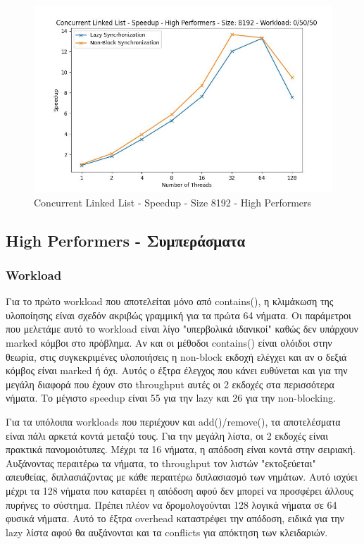 \documentclass[../final_report.tex]{subfiles}
\begin{document}
\begin{figure}[H]
        \includegraphics[scale=0.4]{outFiles/plots/concurrent_data_structs_high_speedup_8192_0_50_50.jpg}
    \caption{Concurrent Linked List - Speedup - Size 8192 - High Performers}
    \label{fig:Concurrent Linked List - Speedup - Size 8192 - High Performers}
\end{figure}

\subsection*{High Performers - Συμπεράσματα}
\subsubsection*{Workload}
Για το πρώτο workload που αποτελείται μόνο από contains(), η κλιμάκωση της υλοποίησης είναι σχεδόν ακριβώς γραμμική
για τα πρώτα 64 νήματα. Οι παράμετροι που μελετάμε αυτό το workload είναι λίγο "υπερβολικά ιδανικοί" καθώς δεν υπάρχουν
marked κόμβοι στο πρόβλημα. Αν και οι μέθοδοι contains() είναι ολόιδοι στην θεωρία, στις συγκεκριμένες υλοποιήσεις η non-block
εκδοχή ελέγχει και αν ο δεξιά κόμβος είναι marked ή όχι. Αυτός ο έξτρα έλεγχος που κάνει ευθύνεται και για την μεγάλη διαφορά που
έχουν στο throughput αυτές οι 2 εκδοχές στα περισσότερα νήματα. Το μέγιστο speedup είναι 55 για την lazy και 26 για την non-blocking.

Για τα υπόλοιπα workloads που περιέχουν και add()/remove(), τα αποτελέσματα είναι πάλι αρκετά κοντά μεταξύ τους. Για την μεγάλη λίστα,
οι 2 εκδοχές είναι πρακτικά πανομοιότυπες. Μέχρι τα 16 νήματα, η απόδοση είναι κοντά στην σειριακή. Αυξάνοντας περαιτέρω τα νήματα, το 
throughput τον λιστών "εκτοξεύεται" απευθείας, διπλασιάζοντας με κάθε περαιτέρω διπλασιασμό των νημάτων. Αυτό ισχύει μέχρι τα 128 νήματα
που καταρέει η απόδοση αφού δεν μπορεί να προσφέρει άλλους πυρήνες το σύστημα. Πρέπει πλέον να δρομολογούνται 128 λογικά νήματα σε 64 φυσικά
νήματα. Αυτό το έξτρα overhead καταστρέφει την απόδοση, ειδικά για την lazy λίστα αφού θα αυξάνονται και τα conflicts για απόκτηση των
κλειδαριών. 
\end{document}
